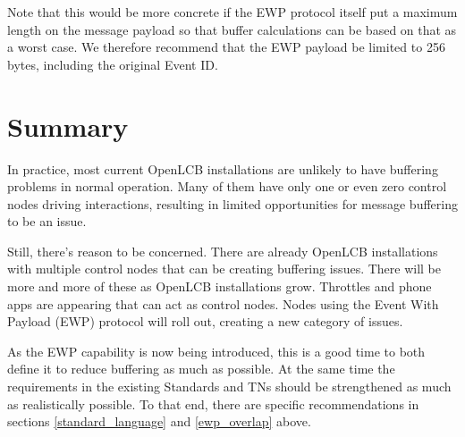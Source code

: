 \documentclass[11pt]{article}
\begin{document}
Note that this would be more concrete if the EWP protocol itself
put a maximum length on the message payload
so that buffer calculations can be based on that as a worst case.
We therefore recommend that the EWP payload be limited to 256 bytes, including
the original Event ID.


\section{Summary}

In practice, most current OpenLCB installations 
are unlikely to have buffering problems in normal operation.  Many of them
have only one or even zero control nodes driving interactions, resulting in 
limited opportunities for message buffering to be an issue.

Still, there's reason to be concerned.
There are already OpenLCB installations with multiple control
nodes that can be creating buffering issues.  
There will be more
and more of these as OpenLCB installations grow.  Throttles 
and phone apps are appearing that can act as control nodes.
Nodes using the Event With Payload (EWP) protocol will roll out, creating a new 
category of issues. 

As the EWP capability is now being introduced,
this is a good time to both define it to reduce buffering as much as possible. 
At the same time the requirements in the existing
Standards and TNs should be strengthened as much as realistically possible. 
To that end, there are specific recommendations in sections
\ref{standard_language} and \ref{ewp_overlap} above. 
\end{document}
